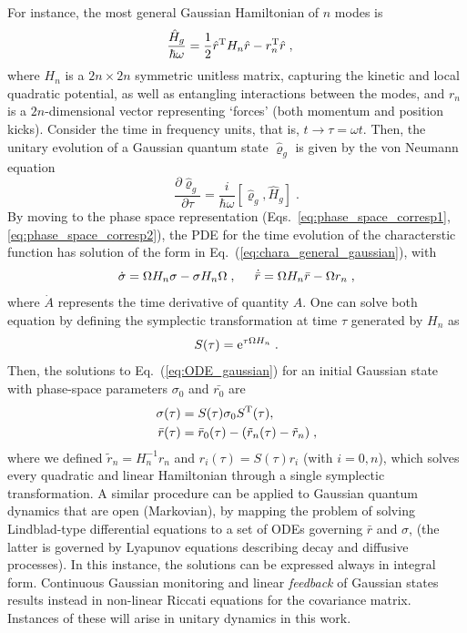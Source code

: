 \documentclass[%
reprint,
superscriptaddress,
nofootinbib,
 amsmath,amssymb,
prx,
floatfix,
]{revtex4-2}
\begin{document}
For instance, the most general Gaussian Hamiltonian of $n$ modes is
\begin{align}
\label{eq:Hamiltonian_max}
    \frac{\hat{H}_g}{\hbar \omega} &=   \frac{1}{2} \hat{r}^{\rm T} H_n \hat{r} - r_n^{\rm T} \hat{r}  \;,
\end{align}
where $H_n$ is a $2n \times 2n$ symmetric unitless matrix, capturing the kinetic and local quadratic potential, as well as entangling interactions between the modes, and $r_n$ is a $2n$-dimensional vector representing `forces' (both momentum and position kicks). %
Consider the time in frequency units, that is, $t \to \tau = \omega t$. Then, the unitary evolution of a Gaussian quantum state $\hat{\varrho}_g$ is given by the von Neumann equation 
\begin{equation}
    \frac{\partial \hat{\varrho}_g}{\partial \tau} = \frac{i}{\hbar \omega} \left[ \hat{\varrho}_g, \hat{H}_g\right] \;. 
\end{equation}
By moving to the phase space representation (Eqs.~\ref{eq:phase_space_corresp1}, \ref{eq:phase_space_corresp2}), the PDE for the time evolution of the characterstic function has solution of the form in Eq.~(\ref{eq:chara_general_gaussian}), with
\begin{equation}
\label{eq:ODE_gaussian}
    \dot{\sigma} = \Omega H_n \sigma - \sigma H_n \Omega \; ,\hspace{0.5cm} \dot{\bar{r}} =  \Omega H_n \bar{r} - \Omega r_n  
    \;,
\end{equation}
where $\dot{A}$ represents the time derivative of quantity $A$. One can solve both equation by defining the symplectic transformation at time $\tau$ generated by $H_n$ as 
\begin{equation}
\label{eq:sympletic_OG}
 S (\tau) = {\rm e}^{\tau \Omega H_n}\;. 
\end{equation}
Then, the solutions to Eq.~(\ref{eq:ODE_gaussian}) for an initial Gaussian state with phase-space parameters $\sigma_0$ and $\bar{r_0}$ are
\begin{align}
\label{eq:cov_gaussian}
\sigma (\tau) &= S(\tau) \sigma_0 S^{\rm T} (\tau) ,\\
     \bar{r}(\tau)  \nonumber
     &= \bar{r}_0(\tau) - ( \tilde{r}_n (\tau) - \tilde{r}_n) \;,
\end{align}
where we defined $\tilde{r}_n =  H_n^{-1} r_n$ and $r_i(\tau) = S (\tau) r_i$ (with $i=0,n$), which solves every quadratic and linear Hamiltonian through a single symplectic transformation. A similar procedure can be applied to Gaussian quantum dynamics that are open (Markovian), by mapping the problem of solving Lindblad-type differential equations to a set of ODEs governing $\bar{r}$ and $\sigma$, (the latter is governed by Lyapunov equations describing decay and diffusive processes). In this instance, the solutions can be expressed always in integral form. Continuous Gaussian monitoring and linear \textit{feedback} of Gaussian states results instead in non-linear Riccati equations for the covariance matrix. Instances of these will arise in unitary dynamics in this work.
\end{document}
